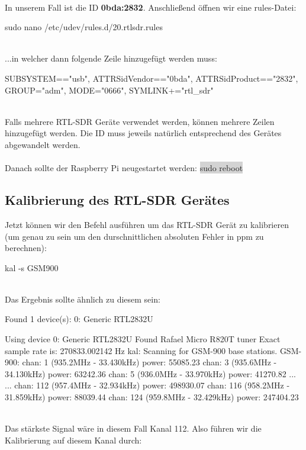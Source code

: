 \noindent{}\\In unserem Fall ist die ID \textbf{0bda:2832}. Anschließend öffnen wir eine rules-Datei:

\begin{code}
sudo nano /etc/udev/rules.d/20.rtlsdr.rules
\end{code}

\noindent\\...in welcher dann folgende Zeile hinzugefügt werden muss:

\begin{code}
SUBSYSTEM=="usb", ATTRS{idVendor}=="0bda", ATTRS{idProduct}=="2832", GROUP="adm", MODE="0666", SYMLINK+="rtl_sdr"
\end{code}

\noindent\\Falls mehrere RTL-SDR Geräte verwendet werden, können mehrere Zeilen hinzugefügt werden. Die ID muss jeweils natürlich entsprechend des Gerätes abgewandelt werden.\\
\\Danach sollte der Raspberry Pi neugestartet werden: \colorbox{lightgray}{sudo reboot}

\subsection{Kalibrierung des RTL-SDR Gerätes}
Jetzt können wir den Befehl ausführen um das RTL-SDR Gerät zu kalibrieren (um genau zu sein um den durschnittlichen absoluten Fehler in ppm zu berechnen):

\begin{code}
kal -s GSM900 
\end{code}

\noindent\\Das Ergebnis sollte ähnlich zu diesem sein:

\begin{code}
Found 1 device(s):
  0:  Generic RTL2832U

Using device 0: Generic RTL2832U
Found Rafael Micro R820T tuner
Exact sample rate is: 270833.002142 Hz
kal: Scanning for GSM-900 base stations.
GSM-900:
	chan: 1 (935.2MHz - 33.430kHz)	power: 55085.23
	chan: 3 (935.6MHz - 34.130kHz)	power: 63242.36
	chan: 5 (936.0MHz - 33.970kHz)	power: 41270.82
...
...
	chan: 112 (957.4MHz - 32.934kHz)	power: 498930.07
	chan: 116 (958.2MHz - 31.859kHz)	power: 88039.44
	chan: 124 (959.8MHz - 32.429kHz)	power: 247404.23
\end{code}

\noindent\\Das stärkste Signal wäre in diesem Fall Kanal 112. Also führen wir die Kalibrierung auf diesem Kanal durch:

